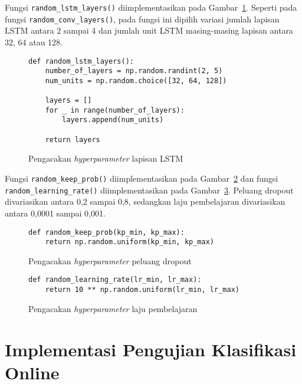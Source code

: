 Fungsi \texttt{random_lstm_layers()} diimplementasikan pada Gambar~\ref{listing:har-random-lstm-layers}. Seperti pada fungsi \texttt{random_conv_layers()}, pada fungsi ini dipilih variasi jumlah lapisan LSTM antara 2 sampai 4 dan jumlah unit LSTM masing-masing lapisan antara 32, 64 atau 128.

\begin{figure}[h]
\begin{verbatim}
def random_lstm_layers():
    number_of_layers = np.random.randint(2, 5)
    num_units = np.random.choice([32, 64, 128])

    layers = []
    for _ in range(number_of_layers):
        layers.append(num_units)

    return layers
\end{verbatim}
\caption{Pengacakan \textit{hyperparameter} lapisan LSTM}
\label{listing:har-random-lstm-layers}
\end{figure}

Fungsi \texttt{random_keep_prob()} diimplementasikan pada Gambar~\ref{listing:har-random-keep-prob} dan fungsi \texttt{random_learning_rate()} diimplementasikan pada Gambar~\ref{listing:har-random-learning-rate}. Peluang dropout divariasikan antara 0,2 sampai 0,8, sedangkan laju pembelajaran divariasikan antara 0,0001 sampai 0,001.

\begin{figure}[h]
\begin{verbatim}
def random_keep_prob(kp_min, kp_max):
    return np.random.uniform(kp_min, kp_max)
\end{verbatim}
\caption{Pengacakan \textit{hyperparameter} peluang dropout}
\label{listing:har-random-keep-prob}
\end{figure}

\begin{figure}[h]
\begin{verbatim}
def random_learning_rate(lr_min, lr_max):
    return 10 ** np.random.uniform(lr_min, lr_max)
\end{verbatim}
\caption{Pengacakan \textit{hyperparameter} laju pembelajaran}
\label{listing:har-random-learning-rate}
\end{figure}

\section{Implementasi Pengujian Klasifikasi Online}


